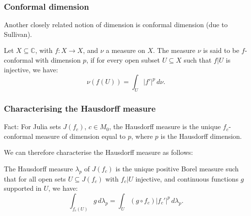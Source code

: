 \documentclass{beamer} %
\theoremstyle{definition} %
\newcommand{\Cplx}{\mathbb{C}}
\begin{document}
\begin{frame}\frametitle{Conformal dimension}
    Another closely related notion of dimension is conformal dimension (due to Sullivan).
    
    Let $X \subseteq \Cplx$, with $f:X\to X$, and $\nu$ a measure on $X$. The measure $\nu$ is said to be
    $f$-conformal with dimension $p$, if for every open subset $U \subseteq X$ such that $f|U$ is injective, we have:
    \begin{equation*}
        \nu(f(U)) = \int_{U} |f'|^p\,d\nu.
    \end{equation*}
    
    
    


%     
\end{frame}

\begin{frame}\frametitle{Characterising the Hausdorff measure}
    Fact: For Julia sets $J(f_c)$, $c \in M_0$, the Hausdorff measure is the unique $f_c$-conformal measure of dimension equal to $p$, where $p$ is the Hausdorff dimension.
    
    We can therefore characterise the Hausdorff measure as follows:
    \begin{theorem}
        The Hausdorff measure $\lambda_p$ of $J(f_c)$ is the unique positive Borel measure such that for all open sets $U\subseteq J(f_c)$ with $f_c|U$ injective,
        and continuous functions $g$ supported in $U$, we have:
        \begin{equation*}
            \int_{f_c(U)} g\,d\lambda_p = \int_U (g\circ f_c)|f_c'|^p\,d\lambda_p.
        \end{equation*}
    \end{theorem}
\end{frame}
\end{document}
